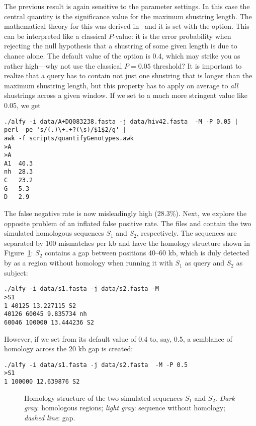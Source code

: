 \documentclass{article}
\begin{document}
\begin{itemize}
\I The previous result is again sensitive to the parameter settings. In this case the central quantity is the significance value
for the maximum shustring length. The mathematical theory for this was derived in~\cite{hau09:est}
and it is set with the  option. This can be interpreted like a
classical $P$-value: it is the error probability when rejecting the
null hypothesis that a shustring of some given length is due to chance
alone. The default value of the  option is 0.4, which
may strike you as rather high---why not use the classical $P=0.05$
threshold? It is important to realize that a query has to
contain not just one shustring that is longer than the maximum
shustring length, but this property has to apply on average to
\textit{all} shustrings across a given window. If we set  to a
much more stringent value like 0.05, we get
\begin{verbatim}
./alfy -i data/A+DQ083238.fasta -j data/hiv42.fasta  -M -P 0.05 | 
perl -pe 's/(.)\+.+?(\s)/$1$2/g' | 
awk -f scripts/quantifyGenotypes.awk
>A
>A
A1	40.3
nh	28.3
C	23.2
G	5.3
D	2.9
\end{verbatim}
The false negative rate is now misleadingly high (28.3\%).
\I Next, we explore the opposite problem of an inflated false positive
rate. The files  and  contain the two
simulated homologous sequences $S_1$ and $S_2$, respectively. The sequences are
separated by 100 mismatches per kb and have the homology structure
shown in Figure~\ref{fig:hom}: $S_2$ contains a gap between positions
40--60 kb, which is duly detected by  as a region without homology when
running it with $S_1$ as query and $S_2$ as subject:
\begin{verbatim}
./alfy -i data/s1.fasta -j data/s2.fasta -M
>S1
1 40125 13.227115 S2
40126 60045 9.835734 nh
60046 100000 13.444236 S2
\end{verbatim}
However, if we set  from its default value of 0.4 to, say, 0.5,
a semblance of homology across the 20 kb gap is created:
\begin{verbatim}
./alfy -i data/s1.fasta -j data/s2.fasta  -M -P 0.5
>S1
1 100000 12.639876 S2
\end{verbatim}
\begin{figure}
\begin{center}

\end{center}
\caption{Homology structure of the two simulated sequences $S_1$ and
  $S_2$. \textit{Dark gray}: homologous regions; \textit{light gray}:
  sequence without homology; \textit{dashed line}: gap.}\label{fig:hom}
\end{figure}


\end{itemize}
\end{document}
